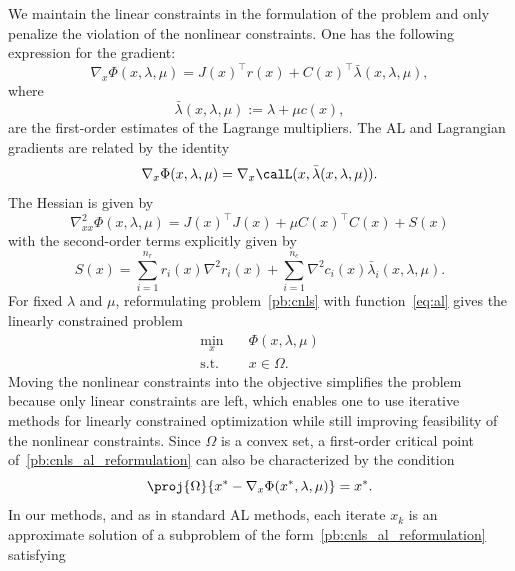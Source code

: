 We maintain the linear constraints in the formulation of the problem and only penalize the violation of the nonlinear constraints.
One has the following expression for the gradient: 
\begin{equation*}
	\nabla_x \Phi(x,\lambda,\mu) = J(x)^\top r(x) + C(x)^\top\bar{\lambda}(x,\lambda,\mu),
\end{equation*}
where
\begin{equation}\label{eq:1st_order_mult}
	\bar{\lambda}(x,\lambda,\mu):=\lambda + \mu c(x),
\end{equation} 
are the first-order estimates of the Lagrange multipliers. The AL and Lagrangian gradients are related by the identity
\begin{equation}\label{eq:identity_al_lag_grad}
	\nabla_x \Phi(x,\lambda,\mu) = \nabla_x \calL(x,\bar{\lambda}(x,\lambda,\mu)).
\end{equation}
The Hessian is given by
\begin{equation*}
	\nabla^2_{xx} \Phi(x,\lambda,\mu) = J(x)^\top J(x) + \mu C(x)^\top C(x) +  S(x) 
\end{equation*}
with the second-order terms explicitly given by
\begin{equation}\label{eq:al_hessian_2nd_terms}
	S(x) =\sum_{i=1}^{n_r} r_i(x) \nabla^2r_i(x) + \sum_{i=1}^{n_c} \nabla^2 c_i(x) \bar{\lambda}_i(x,\lambda,\mu).
\end{equation}
For fixed $\lambda$ and $\mu$, reformulating problem~\eqref{pb:cnls} with function~\eqref{eq:al} gives the linearly constrained problem
\begin{equation}\label{pb:cnls_al_reformulation} 
	\begin{aligned}
		\min_{x} \quad& \Phi(x,\lambda,\mu)  \\
		\text{s.t.}  \quad & x \in \Omega.
	\end{aligned}	
\end{equation}
Moving the nonlinear constraints into the objective simplifies the problem because only linear constraints are left, which enables one to use iterative methods for linearly constrained optimization while still improving feasibility of the nonlinear constraints. Since $\Omega$ is a convex set, a first-order critical point of~\eqref{pb:cnls_al_reformulation} can also be characterized by the condition
\begin{equation*}
	\proj{\Omega}{x^*-\nabla_x \Phi(x^*,\lambda,\mu)} = x^*.
\end{equation*}
In our methods, and as in standard AL methods, each iterate $x_k$ is an approximate solution of a subproblem of the form~\eqref{pb:cnls_al_reformulation} satisfying
